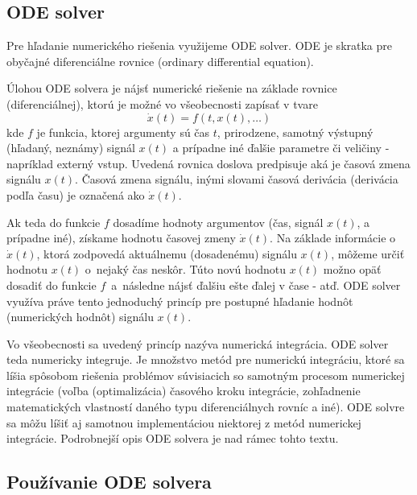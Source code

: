 \documentclass[a4paper, 10pt, ]{article}
\begin{document}
\subsection{ODE solver}


Pre hľadanie numerického riešenia využijeme ODE solver. ODE je skratka pre obyčajné diferenciálne rovnice (ordinary differential equation).

Úlohou ODE solvera je nájsť numerické riešenie na základe rovnice (diferenciálnej), ktorú je možné vo všeobecnosti zapísať v tvare
\begin{equation}
    \dot x(t) = f \left( t, x(t), \ldots \right)
\end{equation}
kde $f$ je funkcia, ktorej argumenty sú čas $t$, prirodzene, samotný výstupný (hľadaný, neznámy) signál $x(t)$ a prípadne iné ďalšie parametre či veličiny - napríklad externý vstup. Uvedená rovnica doslova predpisuje aká je časová zmena signálu $x(t)$. Časová zmena signálu, inými slovami časová derivácia (derivácia podľa času) je označená ako $\dot x(t)$.

Ak teda do funkcie $f$ dosadíme hodnoty argumentov (čas, signál $x(t)$, a prípadne iné), získame hodnotu časovej zmeny $\dot x(t)$. Na základe informácie o $\dot x(t)$, ktorá zodpovedá aktuálnemu (dosadenému) signálu $x(t)$, môžeme určiť hodnotu $x(t)$ o~nejaký čas neskôr. Túto novú hodnotu $x(t)$ možno opäť dosadiť do funkcie $f$~a~následne nájsť ďalšiu ešte ďalej v čase - atď. ODE solver využíva práve tento jednoduchý princíp pre postupné hľadanie hodnôt (numerických hodnôt) signálu $x(t)$.

Vo všeobecnosti sa uvedený princíp nazýva numerická integrácia. ODE solver teda numericky integruje. Je množstvo metód pre numerickú integráciu, ktoré sa líšia spôsobom riešenia problémov súvisiacich so samotným procesom numerickej integrácie (voľba (optimalizácia) časového kroku integrácie, zohľadnenie matematických vlastností daného typu diferenciálnych rovníc a iné). ODE solvre sa môžu líšiť aj samotnou implementáciou niektorej z metód numerickej integrácie. Podrobnejší opis ODE solvera je nad rámec tohto textu.












\subsection{Používanie ODE solvera}
\end{document}
